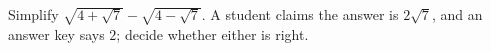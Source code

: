 Simplify $\sqrt{4+\sqrt7}-\sqrt{4-\sqrt7}$. A student claims the answer is $2\sqrt7$, and an answer key says $2$; decide whether either is right.
